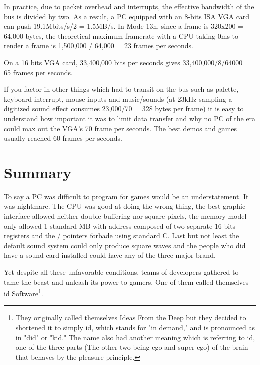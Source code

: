 \documentclass[book.tex]{subfiles}
\begin{document}
 In practice, due to packet overhead and interrupts, the effective bandwidth of the bus is divided by two. As a result, a PC equipped with an 8-bits ISA VGA card can push 19.1Mbits/s/2 = 1.5MB/s. In Mode 13h, since a frame is 320x200 = 64,000 bytes, the theoretical maximum framerate with a CPU taking 0ms to render a frame is 1,500,000 / 64,000 = 23 frames per seconds.\\
 \par
 On a 16 bits VGA card, 33,400,000 bits per seconds gives 33,400,000/8/64000 = 65 frames per seconds.\\
 \par
 If you factor in other things which had to transit on the bus such as palette, keyboard interrupt, mouse inputs and music/sounds (at 23kHz sampling a digitized sound effect consumes 23,000/70 = 328 bytes per frame) it is easy to understand how important it was to limit data transfer and why no PC of the era could max out the VGA's 70 frame per seconds. The best demos and games usually reached 60 frames per seconds.


\section{Summary}
To say a PC was difficult to program for games would be an understatement. It was nightmare. The CPU was good at doing the wrong thing, the best graphic interface allowed neither double buffering nor square pixels, the memory model only allowed 1 standard MB with address composed of two separate 16 bits registers and the / pointers forbade using standard C. Last but not least the default sound system could only produce square waves and the people who did have a sound card installed could have any of the three major brand.\\
\par
Yet despite all these unfavorable conditions, teams of developers gathered to tame the beast and unleash its power to gamers. One of them called themselves id Software\footnote{They originally called themselves Ideas From the Deep but they decided to shortened it to simply id, which stands for "in demand," and is pronounced as in "did" or "kid." The name also had another meaning which is referring to id, one of the three parts (The other two being ego and super-ego) of the brain that behaves by the pleasure principle.}.
\end{document}
